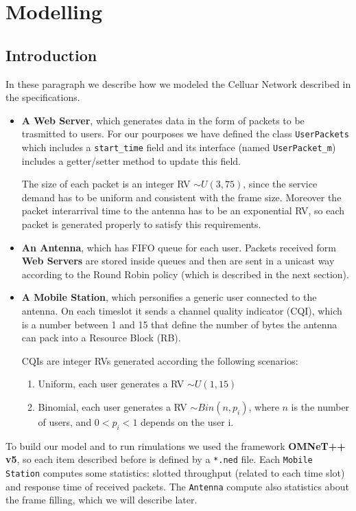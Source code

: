 \chapter{Modelling}
\section{Introduction}
In these paragraph we describe how we modeled the Celluar Network described in the specifications.
\begin{itemize}
   \item \textbf{A Web Server}, which generates data in the form of packets to be trasmitted to users. For our pourposes we have defined the class \texttt{UserPackets} which includes a \texttt{start\_time} field and its interface (named \texttt{UserPacket\_m}) includes a getter/setter method to update this field.
   
   The size of each packet is an integer RV \(\sim U(3,75)\), since the service demand has to be uniform and consistent with the frame size. Moreover the packet interarrival time to the antenna has to be an exponential RV, so each packet is generated properly to satisfy this requirements.

   \item \textbf{An Antenna}, which has FIFO queue for each user. Packets received form \textbf{Web Servers} are stored inside queues and then are sent in a unicast way according to the Round Robin policy (which is described in the next section). 
   
   \item \textbf{A Mobile Station}, which personifies a generic user connected to the antenna. On each timeslot it sends a channel quality indicator (CQI), which is a number between 1 and 15 that define the number of bytes the antenna can pack into a Resource Block (RB).
   
   CQIs are integer RVs generated according the following scenarios:
   
   \begin{enumerate} 
    \item Uniform, each user generates a RV \(\sim U(1,15)\)
    \item Binomial, each user generates a RV \(\sim Bin(n,p_i)\), where \(n\) is the number of users, and \( 0<p_i<1\) depends on the user i.
    \end{enumerate} 
\end{itemize}
To build our model and to run rimulations we used the framework \textbf{OMNeT++ v5}, so each item described before is defined by a \texttt{*.ned} file.
Each \texttt{Mobile Station} computes some statistics: slotted throughput (related to each time slot) and response time of received packets. The \texttt{Antenna} compute also statistics about the frame filling, which we will describe later.

